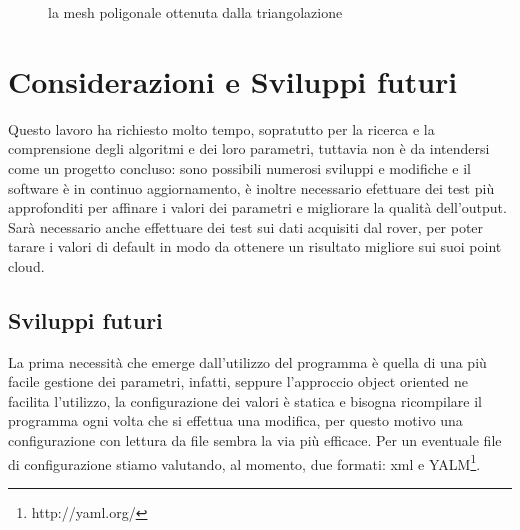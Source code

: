 \documentclass[a4paper,12pt]{article}
\begin{document}
	\begin{figure}
	\centering
	\caption{la mesh poligonale ottenuta dalla triangolazione}
	\label{output}
	\end{figure}
	\clearpage
	
	
\section{Considerazioni e Sviluppi futuri}
Questo lavoro ha richiesto molto tempo, sopratutto per la ricerca e la comprensione degli algoritmi e dei loro 
parametri, tuttavia non è da intendersi come un progetto concluso:
sono possibili numerosi sviluppi e modifiche e il software è in continuo aggiornamento, è inoltre necessario 
efettuare dei test più approfonditi per affinare i valori dei parametri e migliorare la qualità dell'output.
Sarà necessario anche effettuare dei test sui dati acquisiti dal rover, per poter tarare i valori di default
in modo da ottenere un risultato migliore sui suoi point cloud.
	\subsection{Sviluppi futuri}
	La prima necessità che emerge dall'utilizzo del programma è quella di una più facile gestione dei parametri, 
	infatti, seppure l'approccio object oriented ne facilita l'utilizzo, la configurazione dei valori è statica e
	bisogna ricompilare il programma ogni volta che si effettua una modifica, per questo motivo una configurazione
	con lettura da file sembra la via più efficace. Per un eventuale file di configurazione stiamo valutando, 
	al momento, due formati: xml e YALM\footnote{http://yaml.org/}.
	
\end{document}
